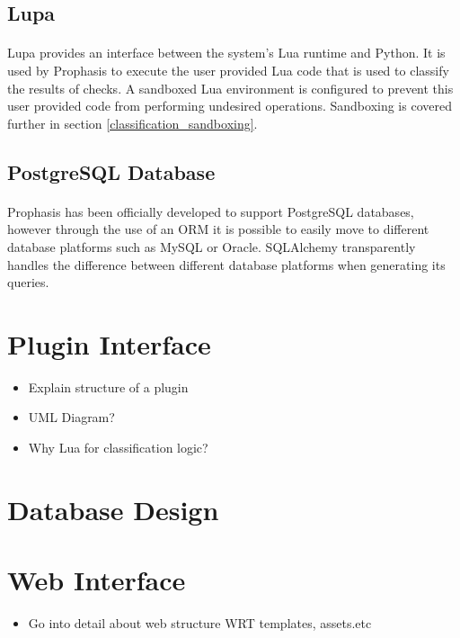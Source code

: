 \documentclass[bsc,logo,twoside]{infthesis}
\begin{document}
\subsection{Lupa}
\paragraph*{}
	Lupa provides an interface between the system's Lua runtime and Python.  It is
	used by Prophasis to execute the user provided Lua code that is used to
	classify the results of checks. A sandboxed Lua environment is configured to
	prevent this user provided code from performing undesired operations.
	Sandboxing is covered further in section \ref{classification_sandboxing}.

\subsection{PostgreSQL Database}	
\paragraph*{}
	Prophasis has been officially developed to support PostgreSQL databases,
	however through the use of an ORM it is possible to easily move to different
	database platforms such as MySQL or Oracle.  SQLAlchemy transparently handles
	the difference between different database platforms when generating its
	queries.

\section{Plugin Interface}
\begin{itemize}
	\item Explain structure of a plugin
	\item UML Diagram?
	\item Why Lua for classification logic?
\end{itemize}

\section{Database Design}

\section{Web Interface}
\begin{itemize}
	\item Go into detail about web structure WRT templates, assets.etc
\end{itemize}
\end{document}
